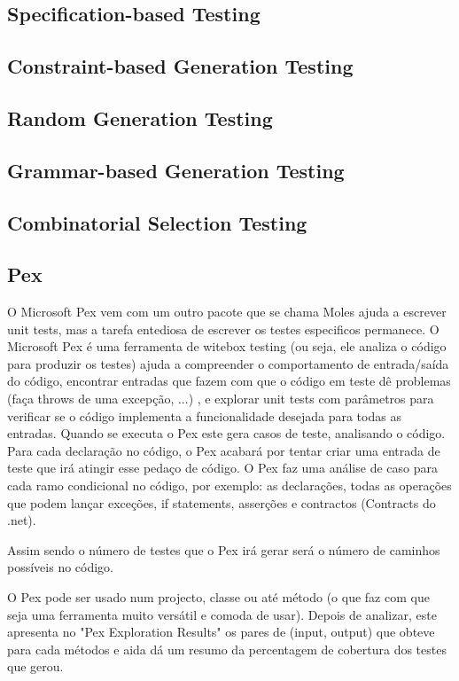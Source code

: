 \documentclass[citeauthoryear]{llncs}
\begin{document}
\subsection{Specification-based Testing}

\subsection{Constraint-based Generation Testing}

\subsection{Random Generation Testing}

\subsection{Grammar-based Generation Testing}

\subsection{Combinatorial Selection Testing}

\subsection{Pex}
O Microsoft Pex vem com um outro pacote que se chama Moles ajuda a escrever unit tests, mas a tarefa entediosa de escrever os testes especificos permanece. 
O Microsoft Pex é uma ferramenta de witebox testing (ou seja, ele analiza o código para produzir os testes) ajuda a compreender o comportamento de entrada/saída do código, encontrar entradas que fazem com que o código em teste dê problemas (faça throws de uma excepção, ...) , e explorar unit tests com parâmetros para verificar se o código implementa a funcionalidade desejada para todas as entradas.
Quando se executa o Pex este gera casos de teste, analisando o código. Para cada declaração no código, o Pex acabará por tentar criar uma entrada de teste que irá atingir esse pedaço de código.
O Pex faz uma análise de caso para cada ramo condicional no código, por exemplo: as declarações, todas as operações que podem lançar exceções, if statements, asserções e contractos (Contracts do .net).

Assim sendo o número de testes que o Pex irá gerar será o número de caminhos possíveis no código.

O Pex pode ser usado num projecto, classe ou até método (o que faz com que seja uma ferramenta muito versátil e comoda de usar). Depois de analizar, este apresenta no "Pex Exploration Results" os pares de (input, output) que obteve para cada métodos e aida dá um resumo da percentagem de cobertura dos testes que gerou.
\end{document}
